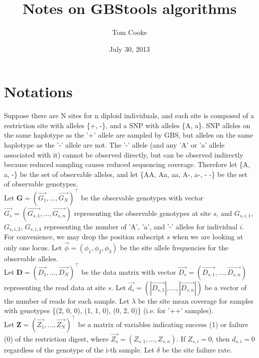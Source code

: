 \documentclass{article}
\begin{document}
\title{Notes on GBStools algorithms}
\date{July 30, 2013}
\author{Tom Cooke}
\maketitle

\section{Notations}
\quad Suppose there are N sites for n diploid individuals, and each site is composed of a restriction site with alleles \{+, -\}, and a SNP with alleles \{A, a\}. SNP alleles on the same haplotype as the '+' allele are sampled by GBS, but alleles on the same haplotype as the '-' allele are not. The '-' allele (and any 'A' or 'a' allele associated with it) cannot be observed directly, but can be observed indirectly because reduced sampling causes reduced sequencing coverage. Therefore let \{A, a, -\} be the set of observable alleles, and let \{AA, Aa, aa, A-, a-, - -\} be the set of observable genotypes. \\
\indent Let $\textbf{G} = (\vec{G_1}, ..., \vec{G_N})^\intercal$ be the observable genotypes with vector $\vec{G_{s}} = (\vec{G_{s,1}}, ..., \vec{G_{s,n}})$ representing the observable genotypes at site $s$, and $G_{s,i,1}$, $G_{s,i,2}$, $G_{s,i,3}$ representing the number of 'A', 'a', and '-' alleles for individual $i$. For convenience, we may drop the position subscript $s$ when we are looking at only one locus. Let $\vec{\phi} = (\phi_{1}, \phi_{2}, \phi_{3})$ be the site allele frequencies for the observable alleles. \\
\indent Let $\textbf{D} = (\vec{D_1}, ..., \vec{D_N})^\intercal$ be the data matrix with vector $\vec{D_s} = (\vec{D_{s,1}}, ..., \vec{D_{s,n}})$ representing the read data at site $s$. Let $\vec{d_s} = (|\vec{D_{s,1}}|, ..., |\vec{D_{s,n}}|)$ be a vector of the number of reads for each sample. Let $\lambda$ be the site mean coverage for samples with genotypes \{(2, 0, 0), (1, 1, 0), (0, 2, 0)\} (i.e. for '++' samples). \\
\indent Let $\textbf{Z} = (\vec{Z_1}, ..., \vec{Z_N})^\intercal$ be a matrix of variables indicating success (1) or failure (0) of the restriction digest, where $\vec{Z_s} = (Z_{s,1}, ..., Z_{s,n})$. If $Z_{s,i} = 0$, then $d_{s,i} = 0$ regardless of the genotype of the i-th sample. Let $\delta$ be the site failure rate. 
\end{document}
